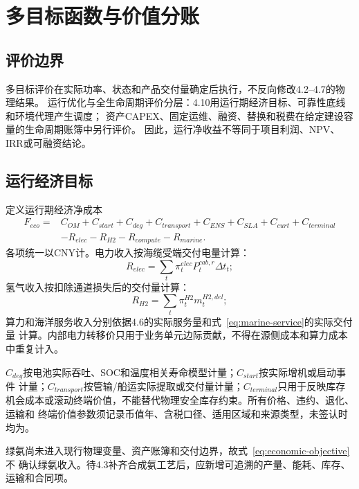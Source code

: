 \section{多目标函数与价值分账}
\label{sec:objective}

\subsection{评价边界}

多目标评价在实际功率、状态和产品交付量确定后执行，不反向修改4.2--4.7的物理结果。
运行优化与全生命周期评价分层：4.10用运行期经济目标、可靠性底线和环境代理产生调度；
资产CAPEX、固定运维、融资、替换和税费在给定建设容量的生命周期账簿中另行评价。
因此，运行净收益不等同于项目利润、NPV、IRR或可融资结论。

\subsection{运行经济目标}

定义运行期经济净成本
\begin{equation}
\begin{aligned}
F_{eco}={}&C_{OM}+C_{start}+C_{deg}+C_{transport}
+C_{ENS}+C_{SLA}+C_{curt}+C_{terminal}\\
&-R_{elec}-R_{H2}-R_{compute}-R_{marine}.
\end{aligned}
\label{eq:economic-objective}
\end{equation}
各项统一以CNY计。电力收入按海缆受端交付电量计算：
\begin{equation}
R_{elec}=\sum_t\pi_t^{elec}P_t^{cab,r}\Delta t_t;
\label{eq:revenue-electricity}
\end{equation}
氢气收入按扣除通道损失后的交付量计算：
\begin{equation}
R_{H2}=\sum_t\pi_t^{H2}m_t^{H2,del};
\label{eq:revenue-hydrogen}
\end{equation}
算力和海洋服务收入分别依据4.6的实际服务量和式~\eqref{eq:marine-service}的实际交付量
计算。内部电力转移价只用于业务单元边际贡献，不得在源侧成本和算力成本中重复计入。

$C_{deg}$按电池实际吞吐、SOC和温度相关寿命模型计量；$C_{start}$按实际增机或启动事件
计量；$C_{transport}$按管输/船运实际提取或交付量计量；$C_{terminal}$只用于反映库存
机会成本或滚动终端价值，不能替代物理安全库存约束。所有价格、违约、退化、运输和
终端价值参数须记录币值年、含税口径、适用区域和来源类型，未签认时均为\assumptiontag。

绿氨尚未进入现行物理变量、资产账簿和交付边界，故式~\eqref{eq:economic-objective}不
确认绿氨收入。待4.3补齐合成氨工艺后，应新增可追溯的产量、能耗、库存、运输和合同项。

